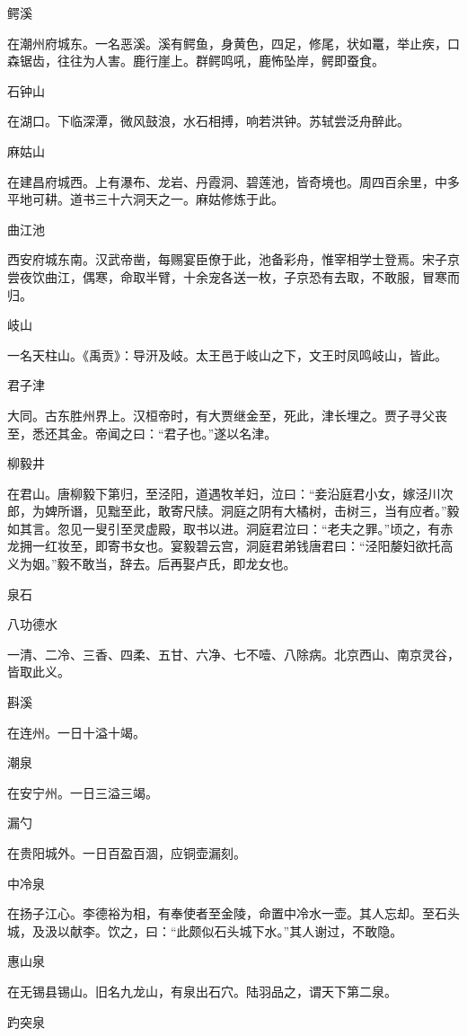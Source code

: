 \documentclass[a4paper,12pt,UTF8,twoside]{ctexbook}
\begin{document}
鳄溪

在潮州府城东。一名恶溪。溪有鳄鱼，身黄色，四足，修尾，状如鼍，举止疾，口森锯齿，往往为人害。鹿行崖上。群鳄鸣吼，鹿怖坠岸，鳄即蚕食。

石钟山

在湖口。下临深潭，微风鼓浪，水石相搏，响若洪钟。苏轼尝泛舟醉此。

麻姑山

在建昌府城西。上有瀑布、龙岩、丹霞洞、碧莲池，皆奇境也。周四百余里，中多平地可耕。道书三十六洞天之一。麻姑修炼于此。

曲江池

西安府城东南。汉武帝凿，每赐宴臣僚于此，池备彩舟，惟宰相学士登焉。宋子京尝夜饮曲江，偶寒，命取半臂，十余宠各送一枚，子京恐有去取，不敢服，冒寒而归。

岐山

一名天柱山。《禹贡》：导汧及岐。太王邑于岐山之下，文王时凤鸣岐山，皆此。

君子津

大同。古东胜州界上。汉桓帝时，有大贾继金至，死此，津长埋之。贾子寻父丧至，悉还其金。帝闻之曰：“君子也。”遂以名津。

柳毅井

在君山。唐柳毅下第归，至泾阳，道遇牧羊妇，泣曰：“妾沿庭君小女，嫁泾川次郎，为婢所谮，见黜至此，敢寄尺牍。洞庭之阴有大橘树，击树三，当有应者。”毅如其言。忽见一叟引至灵虚殿，取书以进。洞庭君泣曰：“老夫之罪。”顷之，有赤龙拥一红妆至，即寄书女也。宴毅碧云宫，洞庭君弟钱唐君曰：“泾阳嫠妇欲托高义为姻。”毅不敢当，辞去。后再娶卢氏，即龙女也。

泉石

八功德水

一清、二冷、三香、四柔、五甘、六净、七不噎、八除病。北京西山、南京灵谷，皆取此义。

斟溪

在连州。一日十溢十竭。

潮泉

在安宁州。一日三溢三竭。

漏勺

在贵阳城外。一日百盈百涸，应铜壶漏刻。

中冷泉

在扬子江心。李德裕为相，有奉使者至金陵，命置中冷水一壶。其人忘却。至石头城，及汲以献李。饮之，曰：“此颇似石头城下水。”其人谢过，不敢隐。

惠山泉

在无锡县锡山。旧名九龙山，有泉出石穴。陆羽品之，谓天下第二泉。

趵突泉
\end{document}
